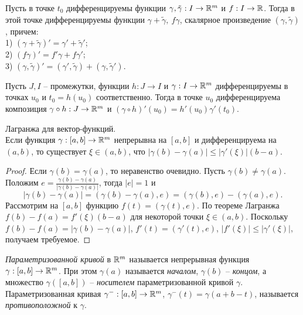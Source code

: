     \begin{corollary}
        Пусть в точке $t_{0}$ дифференцируемы функции $\gamma, \tilde\gamma: I \to \mathbb{R}^m$ и $f: I \to \mathbb{R}$. Тогда в этой точке дифференцируемы функции $\gamma + \tilde\gamma, \ f\gamma$, скалярное произведение $(\gamma, \tilde\gamma)$, причем:\\
        1) $(\gamma + \tilde\gamma)' = \gamma' + \tilde\gamma'$;\\
        2) $(f\gamma)' = f'\gamma + f\gamma'$;\\
        3) $(\gamma, \tilde\gamma)' = (\gamma', \tilde\gamma) + (\gamma, \tilde\gamma')$.
    \end{corollary}
    
    \begin{corollary}
        Пусть $J, I$ -- промежутки, функции $h: J \to I$ и $\gamma: I \to \mathbb{R}^m$ дифференцируемы в точках $u_{0}$ и $t_{0} = h(u_{0})$ соответственно. Тогда в точке $u_{0}$ дифференцируема композиция $\gamma\circ h: J \to \mathbb{R}^m$ и $(\gamma\circ h)'(u_{0}) = h'(u_{0})\gamma'(t_{0})$.
    \end{corollary}
    
    \begin{theorem}{Лагранжа для вектор-функций.}\\
        Если функция $\gamma: [a, b] \to \mathbb{R}^m$ непрерывна на $[a, b]$ и дифференцируема на $(a, b)$, то существует $\xi \in (a, b)$, что $|\gamma(b) - \gamma(a)| \leq |\gamma'(\xi)|(b - a)$.
    \end{theorem}
    
    \begin{proof}
        Если $\gamma(b) = \gamma(a)$, то неравенство очевидно. Пусть $\gamma(b) \neq \gamma(a)$. Положим $e = \frac{\gamma(b) - \gamma(a)}{|\gamma(b) - \gamma(a)|}$, тогда $|e| = 1$ и 
        \[|\gamma(b) - \gamma(a)| = (\gamma(b) - \gamma(a), e) = (\gamma(b), e) - (\gamma(a), e).\]
        Рассмотрим на $[a, b]$ функцию $f(t) = (\gamma(t), e)$. По теореме Лагранжа $f(b) - f(a) = f'(\xi)(b - a)$ для некоторой точки $\xi \in (a, b)$. Поскольку $f(b) - f(a) = |\gamma(b) - \gamma(a)|$, $f'(t) = (\gamma'(t), e)$, $|f'(\xi)| \leq |\gamma'(\xi)|$, получаем требуемое.
    \end{proof}
    
    \begin{definition}
        \textit{Параметризованной кривой} в $\mathbb{R}^m$ называется непрерывная функция $\gamma: [a, b] \to \mathbb{R}^m$. При этом $\gamma(a)$ называется \textit{началом}, $\gamma(b)$ -- \textit{концом}, а множество $\gamma([a, b])$ -- \textit{носителем} параметризованной кривой $\gamma$.\\
        Параметризованная кривая $\gamma^{-}: [a, b] \to \mathbb{R}^m$, $\gamma^{-}(t) = \gamma(a + b - t)$, называется \textit{противоположной} к $\gamma$.
    \end{definition}
    
